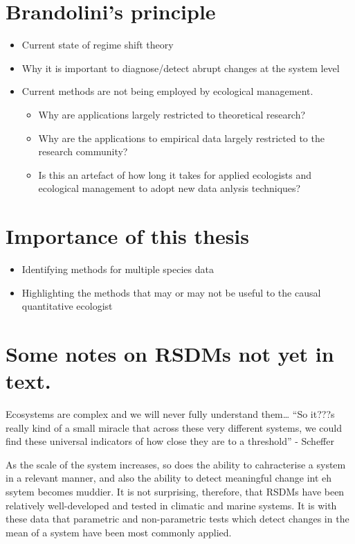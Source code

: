 \documentclass[12pt,twoside,openany]{reedthesis}
\providecommand{\tightlist}{%
  \setlength{\itemsep}{0pt}\setlength{\parskip}{0pt}}
\begin{document}
\hypertarget{brandolinis-principle}{%
\section{Brandolini's principle}\label{brandolinis-principle}}
\begin{itemize}
\tightlist
\item
  Current state of regime shift theory
\item
  Why it is important to diagnose/detect abrupt changes at the system level
\item
  Current methods are not being employed by ecological management.
  \begin{itemize}
  \tightlist
  \item
    Why are applications largely restricted to theoretical research?
  \item
    Why are the applications to empirical data largely restricted to the research community?
  \item
    Is this an artefact of how long it takes for applied ecologists and ecological management to adopt new data anlysis techniques?
  \end{itemize}
\end{itemize}
\hypertarget{importance-of-this-thesis}{%
\section{Importance of this thesis}\label{importance-of-this-thesis}}
\begin{itemize}
\tightlist
\item
  Identifying methods for multiple species data
\item
  Highlighting the methods that may or may not be useful to the causal quantitative ecologist
\end{itemize}
\hypertarget{some-notes-on-rsdms-not-yet-in-text.}{%
\section{Some notes on RSDMs not yet in text.}\label{some-notes-on-rsdms-not-yet-in-text.}}

Ecosystems are complex and we will never fully understand them\ldots{} ``So it???s really kind of a small miracle that across these very different systems, we could find these universal indicators of how close they are to a threshold'' - Scheffer

As the scale of the system increases, so does the ability to cahracterise a system in a relevant manner, and also the ability to detect meaningful change int eh ssytem becomes muddier. It is not surprising, therefore, that RSDMs have been relatively well-developed and tested in climatic and marine systems. It is with these data that parametric and non-parametric tests which detect changes in the mean of a system have been most commonly applied.
\end{document}
